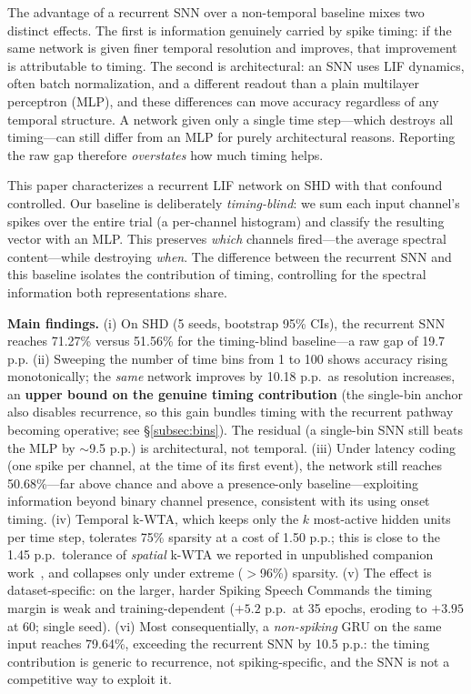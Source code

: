\documentclass[11pt]{article}
\begin{document}
The advantage of a recurrent SNN over a non-temporal baseline mixes two distinct effects. The first is information genuinely carried by spike timing: if the same network is given finer temporal resolution and improves, that improvement is attributable to timing. The second is architectural: an SNN uses LIF dynamics, often batch normalization, and a different readout than a plain multilayer perceptron (MLP), and these differences can move accuracy regardless of any temporal structure. A network given only a single time step---which destroys all timing---can still differ from an MLP for purely architectural reasons. Reporting the raw gap therefore \emph{overstates} how much timing helps.

This paper characterizes a recurrent LIF network on SHD with that confound controlled. Our baseline is deliberately \emph{timing-blind}: we sum each input channel's spikes over the entire trial (a per-channel histogram) and classify the resulting vector with an MLP. This preserves \emph{which} channels fired---the average spectral content---while destroying \emph{when}. The difference between the recurrent SNN and this baseline isolates the contribution of timing, controlling for the spectral information both representations share.

\textbf{Main findings.} (i) On SHD (5 seeds, bootstrap 95\% CIs), the recurrent SNN reaches 71.27\% versus 51.56\% for the timing-blind baseline---a raw gap of 19.7 p.p. (ii) Sweeping the number of time bins from 1 to 100 shows accuracy rising monotonically; the \emph{same} network improves by 10.18 p.p.\ as resolution increases, an \textbf{upper bound on the genuine timing contribution} (the single-bin anchor also disables recurrence, so this gain bundles timing with the recurrent pathway becoming operative; see \S\ref{subsec:bins}). The residual (a single-bin SNN still beats the MLP by $\sim$9.5 p.p.) is architectural, not temporal. (iii) Under latency coding (one spike per channel, at the time of its first event), the network still reaches 50.68\%---far above chance and above a presence-only baseline---exploiting information beyond binary channel presence, consistent with its using onset timing. (iv) Temporal k-WTA, which keeps only the $k$ most-active hidden units per time step, tolerates 75\% sparsity at a cost of 1.50 p.p.; this is close to the 1.45 p.p.\ tolerance of \emph{spatial} k-WTA we reported in unpublished companion work~\citep{pinho2026kwta}, and collapses only under extreme ($>$96\%) sparsity. (v) The effect is dataset-specific: on the larger, harder Spiking Speech Commands the timing margin is weak and training-dependent ($+5.2$ p.p.\ at 35 epochs, eroding to $+3.95$ at 60; single seed). (vi) Most consequentially, a \emph{non-spiking} GRU on the same input reaches 79.64\%, exceeding the recurrent SNN by 10.5 p.p.: the timing contribution is generic to recurrence, not spiking-specific, and the SNN is not a competitive way to exploit it.
\end{document}

